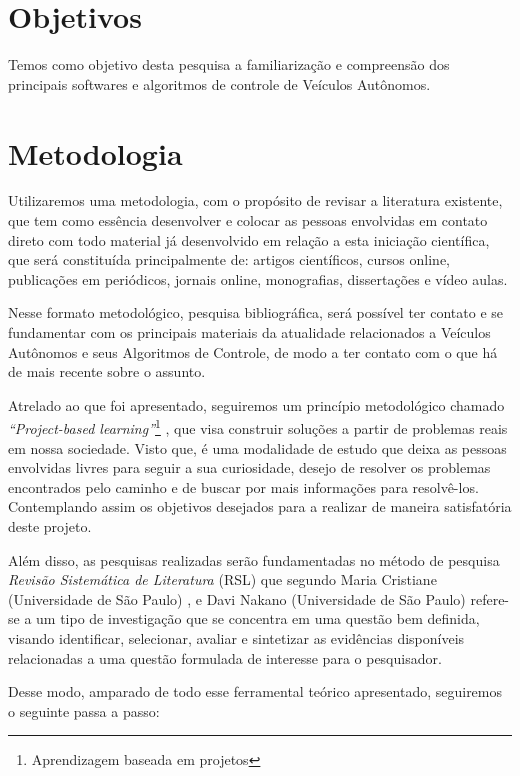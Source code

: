 \documentclass{article}
\begin{document}
\section{Objetivos} \label{objetivo}
Temos como objetivo desta pesquisa a familiarização e compreensão dos principais softwares e algoritmos de controle de Veículos Autônomos.



\section{Metodologia} \label{Metodologia}
Utilizaremos uma metodologia, com o propósito de revisar a literatura existente, que tem como essência desenvolver e colocar as pessoas envolvidas em contato direto com todo material já desenvolvido em relação a esta iniciação científica, que será constituída principalmente de: artigos científicos, cursos online, publicações em periódicos, jornais online, monografias, dissertações e vídeo aulas.

Nesse formato metodológico, pesquisa bibliográfica, será possível ter contato e se fundamentar com os principais materiais da atualidade relacionados a Veículos Autônomos e seus Algoritmos de Controle, de modo a ter contato com o que há de mais recente sobre o assunto.


Atrelado ao que foi apresentado, seguiremos um princípio metodológico chamado \textit{“Project-based learning”}\footnote{Aprendizagem baseada em projetos} \cite{krajcik2006project}, que visa construir soluções a partir de problemas reais em nossa sociedade. Visto que, é uma modalidade de estudo que deixa as pessoas envolvidas livres para seguir a sua curiosidade, desejo de resolver os problemas encontrados pelo caminho e de buscar por mais informações para resolvê-los. Contemplando assim os objetivos desejados para a realizar de maneira satisfatória deste projeto. 

Além disso, as pesquisas realizadas serão fundamentadas no método de pesquisa \textit{Revisão Sistemática de Literatura} (RSL) que segundo Maria Cristiane (Universidade de São Paulo) \cite{revi3}, e Davi Nakano (Universidade de São Paulo) \cite{revi2} refere-se a um tipo de investigação que se concentra em uma questão bem definida, visando identificar, selecionar, avaliar e sintetizar as evidências disponíveis relacionadas a uma questão formulada de interesse para o pesquisador.

Desse modo, amparado de todo esse ferramental teórico apresentado, seguiremos o seguinte passa a passo:
\end{document}
